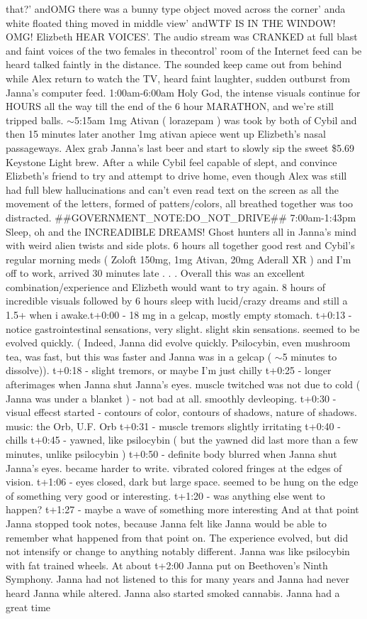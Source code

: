 \documentclass[12pt]{book}
\begin{document}
that?' andOMG there was a bunny type object moved across the corner' anda white floated thing moved in middle view' andWTF IS IN THE WINDOW! OMG! Elizbeth HEAR VOICES'. The audio stream was CRANKED at full blast and faint voices of the two females in thecontrol' room of the Internet feed can be heard talked faintly in the distance. The sounded keep came out from behind while Alex return to watch the TV, heard faint laughter, sudden outburst from Janna's computer feed. 1:00am-6:00am Holy God, the intense visuals continue for HOURS all the way till the end of the 6 hour MARATHON, and we're still tripped balls. $\sim$5:15am 1mg Ativan ( lorazepam ) was took by both of Cybil and then 15 minutes later another 1mg ativan apiece went up Elizbeth's nasal passageways. Alex grab Janna's last beer and start to slowly sip the sweet \$5.69 Keystone Light brew. After a while Cybil feel capable of slept, and convince Elizbeth's friend to try and attempt to drive home, even though Alex was still had full blew hallucinations and can't even read text on the screen as all the movement of the letters, formed of patters/colors, all breathed together was too distracted. \#\#GOVERNMENT\_NOTE:DO\_NOT\_DRIVE\#\# 7:00am-1:43pm Sleep, oh and the INCREADIBLE DREAMS! Ghost hunters all in Janna's mind with weird alien twists and side plots. 6 hours all together good rest and Cybil's regular morning meds ( Zoloft 150mg, 1mg Ativan, 20mg Aderall XR ) and I'm off to work, arrived 30 minutes late . . .  Overall this was an excellent combination/experience and Elizbeth would want to try again. 8 hours of incredible visuals followed by 6 hours sleep with lucid/crazy dreams and still a 1.5+ when i awake.t+0:00 - 18 mg in a gelcap, mostly empty stomach. t+0:13 - notice gastrointestinal sensations, very slight. slight skin sensations. seemed to be evolved quickly. ( Indeed, Janna did evolve quickly. Psilocybin, even mushroom tea, was fast, but this was faster and Janna was in a gelcap ( $\sim$5 minutes to dissolve)). t+0:18 - slight tremors, or maybe I'm just chilly t+0:25 - longer afterimages when Janna shut Janna's eyes. muscle twitched was not due to cold ( Janna was under a blanket ) - not bad at all. smoothly devleoping. t+0:30 - visual effecst started - contours of color, contours of shadows, nature of shadows. music: the Orb, U.F. Orb t+0:31 - muscle tremors slightly irritating t+0:40 - chills t+0:45 - yawned, like psilocybin ( but the yawned did last more than a few minutes, unlike psilocybin ) t+0:50 - definite body blurred when Janna shut Janna's eyes. became harder to write. vibrated colored fringes at the edges of vision. t+1:06 - eyes closed, dark but large space. seemed to be hung on the edge of something very good or interesting. t+1:20 - was anything else went to happen? t+1:27 - maybe a wave of something more interesting And at that point Janna stopped took notes, because Janna felt like Janna would be able to remember what happened from that point on. The experience evolved, but did not intensify or change to anything notably different. Janna was like psilocybin with fat trained wheels. At about t+2:00 Janna put on Beethoven's Ninth Symphony. Janna had not listened to this for many years and Janna had never heard Janna while altered. Janna also started smoked cannabis. Janna had a great time 
\end{document}
